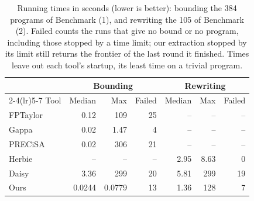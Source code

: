\begin{table}[H] \centering \small
\caption{Running times in seconds (lower is better): bounding the 384 programs of Benchmark (1), and rewriting the 105 of Benchmark (2). Failed counts the runs that give no bound or no program, including those stopped by a time limit; our extraction stopped by its limit still returns the frontier of the last round it finished. Times leave out each tool's startup, its least time on a trivial program.}\label{tab:runtime}
\begin{tabular}{lrrrrrr}
\toprule
& \multicolumn{3}{c}{Bounding} & \multicolumn{3}{c}{Rewriting} \\
\cmidrule(lr){2-4}\cmidrule(lr){5-7}
Tool & Median & Max & Failed & Median & Max & Failed \\
\midrule
FPTaylor & 0.12 & 109 & 25 & -- & -- & -- \\
Gappa & 0.02 & 1.47 & 4 & -- & -- & -- \\
PRECiSA & 0.02 & 306 & 21 & -- & -- & -- \\
Herbie & -- & -- & -- & 2.95 & 8.63 & 0 \\
Daisy & 3.36 & 299 & 20 & 5.81 & 299 & 19 \\
Ours & 0.0244 & 0.0779 & 13 & 1.36 & 128 & 7 \\
\bottomrule
\end{tabular}
\end{table}

